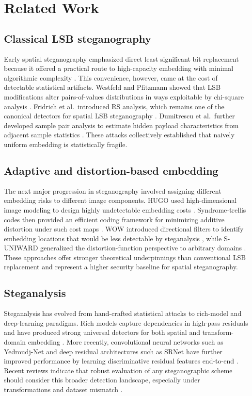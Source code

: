 \section{Related Work}
\subsection{Classical LSB steganography}
Early spatial steganography emphasized direct least significant bit replacement because it offered a practical route to high-capacity embedding with minimal algorithmic complexity \cite{bender1996,fridrich2009book}. This convenience, however, came at the cost of detectable statistical artifacts. Westfeld and Pfitzmann showed that LSB modifications alter pairs-of-values distributions in ways exploitable by chi-square analysis \cite{westfeld1999}. Fridrich et al.\ introduced RS analysis, which remains one of the canonical detectors for spatial LSB steganography \cite{fridrich2001}. Dumitrescu et al.\ further developed sample pair analysis to estimate hidden payload characteristics from adjacent sample statistics \cite{dumitrescu2003}. These attacks collectively established that naively uniform embedding is statistically fragile.

\subsection{Adaptive and distortion-based embedding}
The next major progression in steganography involved assigning different embedding risks to different image components. HUGO used high-dimensional image modeling to design highly undetectable embedding costs \cite{pevny2010}. Syndrome-trellis codes then provided an efficient coding framework for minimizing additive distortion under such cost maps \cite{filler2011,filler2010}. WOW introduced directional filters to identify embedding locations that would be less detectable by steganalysis \cite{holub2012}, while S-UNIWARD generalized the distortion-function perspective to arbitrary domains \cite{holub2014}. These approaches offer stronger theoretical underpinnings than conventional LSB replacement and represent a higher security baseline for spatial steganography.

\subsection{Steganalysis}
Steganalysis has evolved from hand-crafted statistical attacks to rich-model and deep-learning paradigms. Rich models capture dependencies in high-pass residuals and have produced strong universal detectors for both spatial and transform-domain embedding \cite{fridrich2012rich,kodovsky2012ensemble,denemark2015}. More recently, convolutional neural networks such as Yedroudj-Net and deep residual architectures such as SRNet have further improved performance by learning discriminative residual features end-to-end \cite{yedroudj2018,boroumand2019}. Recent reviews indicate that robust evaluation of any steganographic scheme should consider this broader detection landscape, especially under transformations and dataset mismatch \cite{systematic2024,alrusaini2025}.

